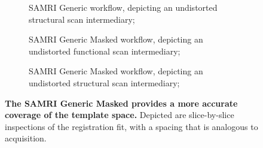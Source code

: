 \begin{figure}[h!]
\begin{subfigure}[t]{0.48\textwidth}
{			}
		\caption{
			SAMRI Generic workflow, depicting an undistorted structural scan intermediary;
			\vspace{1em}
			}
		\label{fig:fit_gga}
	\end{subfigure}
	\begin{subfigure}[t]{0.48\textwidth}
		\centering
		\setlength{\fboxsep}{0pt}%
		\setlength{\fboxrule}{0.2pt}%
		\caption{
			SAMRI Generic Masked workflow, depicting an undistorted functional scan intermediary;
			}
		\label{fig:fit_ll}
	\end{subfigure}\hfill
	\begin{subfigure}[t]{0.48\textwidth}
		\centering
		\setlength{\fboxsep}{0pt}%
		\setlength{\fboxrule}{0.2pt}%
		\caption{
			SAMRI Generic Masked workflow, depicting an undistorted structural scan intermediary;
			}
		\label{fig:fit_lg}
	\end{subfigure}
	\caption{
		\textbf{The SAMRI Generic Masked provides a more accurate coverage of the template space.}
		Depicted are slice-by-slice inspections of the registration fit, with a spacing that is analogous to acquisition.
		}
	\label{fig:fit}
\end{figure}

